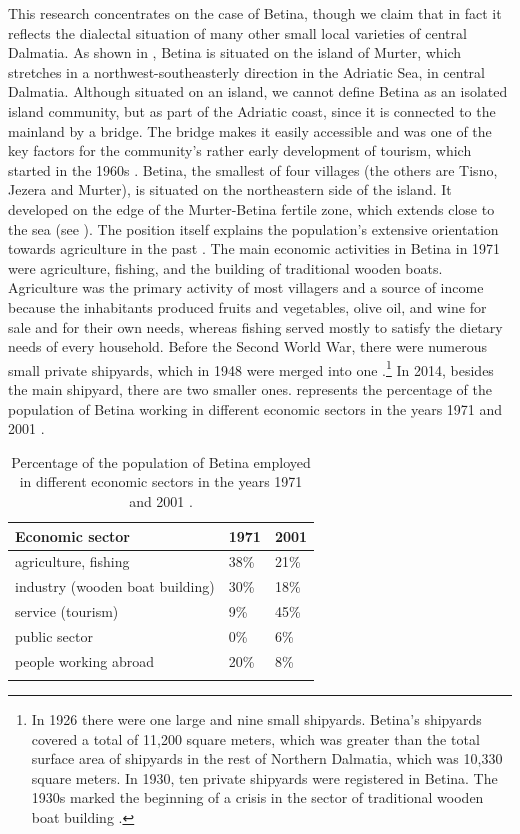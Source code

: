 \documentclass[output=paper]{LSP/langsci}
\begin{document}
This research concentrates on the case of Betina, though we claim that in fact it reflects the dialectal situation of many other small local varieties of central Dalmatia. As shown in , Betina is situated on the island of Murter, which stretches in a northwest-southeasterly direction in the Adriatic Sea, in central Dalmatia. Although situated on an island, we cannot define Betina as an isolated island community, but as part of the Adriatic coast, since it is connected to the mainland by a bridge. The bridge makes it easily accessible and was one of the key factors for the community’s rather early development of tourism, which started in the 1960s \citep[138]{kulusic_murterski_1984}. Betina, the smallest of four villages (the others are Tisno, Jezera and Murter), is situated on the northeastern side of the island. It developed on the edge of the Murter-Betina fertile zone, which extends close to the sea (see ). The position itself explains the population's extensive orientation towards agriculture in the past \citep[12]{skracic_otok_2010}. The main economic activities in Betina in 1971 were agriculture, fishing, and the building of traditional wooden boats. Agriculture was the primary activity of most villagers and a source of income because the inhabitants produced fruits and vegetables, olive oil, and wine for sale and for their own needs, whereas fishing served mostly to satisfy the dietary needs of every household. Before the Second World War, there were numerous small private shipyards, which in 1948 were merged into one \citep[21]{filipi_betinska_1997}.\footnote{In 1926 there were one large and nine small shipyards. Betina’s shipyards covered a total of 11,200 square meters, which was greater than the total surface area of shipyards in the rest of Northern Dalmatia, which was 10,330 square meters. In 1930, ten private shipyards were registered in Betina. The 1930s marked the beginning of a crisis in the sector of traditional wooden boat building \citep[19]{filipi_betinska_1997}.} In 2014, besides the main shipyard, there are two smaller ones.  represents the percentage of the population of Betina working in different economic sectors in the years 1971 and 2001 \citep[21]{skracic_otok_2010}.

\begin{table}
\begin{tabular}{lll} 
\lsptoprule
Economic sector & 1971 & 2001\\
\midrule
agriculture, fishing & 38\% & 21\%\\
industry (wooden boat building) & 30\% & 18\%\\
service (tourism) & 9\% & 45\%\\
public sector & 0\% & 6\%\\
people working abroad & 20\% & 8\%\\
\lspbottomrule
\end{tabular}
\caption{Percentage of the population of Betina employed in different economic sectors in the years 1971 and 2001 \citep{skracic_otok_2010}.}
\label{tab:1}
\end{table}
\end{document}

